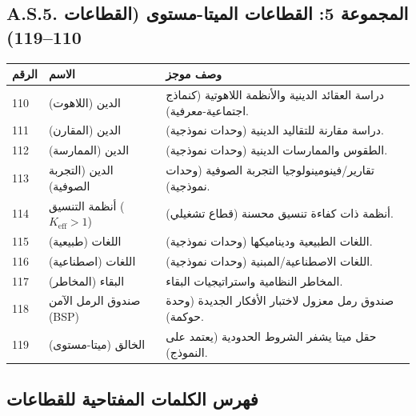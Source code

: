 \documentclass[13pt,a4paper]{article}
\newcommand{\Keff}{K_{\mathrm{eff}}}
\begin{document}
	\subsection*{A.S.5. المجموعة 5: القطاعات الميتا-مستوى (القطاعات 110--119)}
	
	\begin{longtable}{|p{0.9cm}|p{6.0cm}|p{8.6cm}|}
		\hline
		\textbf{الرقم} & \textbf{الاسم} & \textbf{وصف موجز} \\
		\hline
		\endhead
		110 & الدين (اللاهوت) & دراسة العقائد الدينية والأنظمة اللاهوتية (كنماذج اجتماعية-معرفية). \\
		\hline
		111 & الدين (المقارن) & دراسة مقارنة للتقاليد الدينية (وحدات نموذجية). \\
		\hline
		112 & الدين (الممارسة) & الطقوس والممارسات الدينية (وحدات نموذجية). \\
		\hline
		113 & الدين (التجربة الصوفية) & تقارير/فينومينولوجيا التجربة الصوفية (وحدات نموذجية). \\
		\hline
		114 & أنظمة التنسيق ($\Keff>1$) & أنظمة ذات كفاءة تنسيق محسنة (قطاع تشغيلي). \\
		\hline
		115 & اللغات (طبيعية) & اللغات الطبيعية وديناميكها (وحدات نموذجية). \\
		\hline
		116 & اللغات (اصطناعية) & اللغات الاصطناعية/المبنية (وحدات نموذجية). \\
		\hline
		117 & البقاء (المخاطر) & المخاطر النظامية واستراتيجيات البقاء. \\
		\hline
		118 & صندوق الرمل الآمن (BSP) & صندوق رمل معزول لاختبار الأفكار الجديدة (وحدة حوكمة). \\
		\hline
		119 & الخالق (ميتا-مستوى) & حقل ميتا يشفر الشروط الحدودية (يعتمد على النموذج). \\
		\hline
	\end{longtable}
	
	\subsection*{فهرس الكلمات المفتاحية للقطاعات}
	
\end{document}
